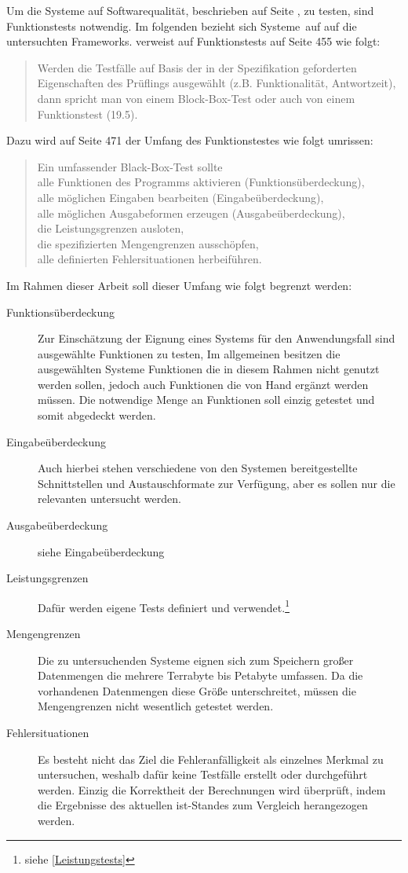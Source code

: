 \label{grundlagen-funktionstests}
Um die Systeme auf Softwarequalität, beschrieben auf Seite \pageref{softwarequalität}, zu testen, sind Funktionstests notwendig.
Im folgenden bezieht sich \glqq Systeme\grqq\ auf auf die untersuchten Frameworks.
\cite{book:softwareengineering} verweist auf Funktionstests auf Seite 455 wie folgt:
\begin{quote}
Werden die Testfälle auf Basis der in der Spezifikation geforderten Eigenschaften des Prüflings ausgewählt (z.B. Funktionalität, Antwortzeit), dann spricht man von einem Block-Box-Test oder auch von einem Funktionstest (19.5).
\end{quote}
Dazu wird auf Seite 471 der Umfang des Funktionstestes wie folgt umrissen:
\begin{quote}
Ein umfassender Black-Box-Test sollte\\
alle Funktionen des Programms aktivieren (Funktionsüberdeckung),\\
alle möglichen Eingaben bearbeiten (Eingabeüberdeckung),\\
alle möglichen Ausgabeformen erzeugen (Ausgabeüberdeckung),\\
die Leistungsgrenzen ausloten,\\
die spezifizierten Mengengrenzen ausschöpfen,\\
alle definierten Fehlersituationen herbeiführen.
\end{quote}
Im Rahmen dieser Arbeit soll dieser Umfang wie folgt begrenzt werden:
\begin{description}
\item[Funktionsüberdeckung] Zur Einschätzung der Eignung eines Systems für den Anwendungsfall sind ausgewählte Funktionen zu testen, Im allgemeinen besitzen die ausgewählten Systeme Funktionen die in diesem Rahmen nicht genutzt werden sollen, jedoch auch Funktionen die von Hand ergänzt werden müssen. Die notwendige Menge an Funktionen soll einzig getestet und somit abgedeckt werden.
\item[Eingabeüberdeckung] Auch hierbei stehen verschiedene von den Systemen bereitgestellte Schnittstellen und Austauschformate zur Verfügung, aber es sollen nur die relevanten untersucht werden.
\item[Ausgabeüberdeckung] siehe Eingabeüberdeckung
\item[Leistungsgrenzen] Dafür werden eigene Tests definiert und verwendet.\footnote{siehe \ref{Leistungstests}}
\item[Mengengrenzen] Die zu untersuchenden Systeme eignen sich zum Speichern großer Datenmengen die mehrere Terrabyte bis Petabyte umfassen. Da die vorhandenen Datenmengen diese Größe unterschreitet, müssen die Mengengrenzen nicht wesentlich getestet werden.
\item[Fehlersituationen] Es besteht nicht das Ziel die Fehleranfälligkeit als einzelnes Merkmal zu untersuchen, weshalb dafür keine Testfälle erstellt oder durchgeführt werden. Einzig die Korrektheit der Berechnungen wird überprüft, indem die Ergebnisse des aktuellen ist-Standes zum Vergleich herangezogen werden. 
\end{description}

